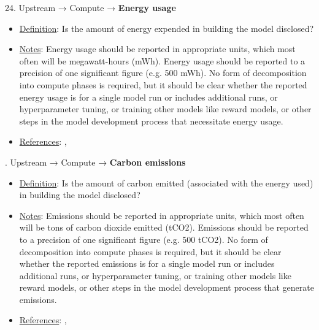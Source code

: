 24. Upstream → Compute → \textbf{Energy usage}
\vspace{-\parskip}
\begin{itemize}
	\item
	\underline{Definition}: Is the amount of energy expended in building the model disclosed?
	\item
	\underline{Notes}: Energy usage should be reported in appropriate units, which most often will be megawatt-hours (mWh). Energy usage should be reported to a precision of one significant figure (e.g. 500 mWh). No form of decomposition into compute phases is required, but it should be clear whether the reported energy usage is for a single model run or includes additional runs, or hyperparameter tuning, or training other models like reward models, or other steps in the model development process that necessitate energy usage.
	\item
	\underline{References}: \citet{lacoste2019quantifying}, \citet{patterson2021carbon}
\end{itemize} \vspace{\baselineskip}


. Upstream → Compute → \textbf{Carbon emissions}
\vspace{-\parskip}
\begin{itemize}
	\item
	\underline{Definition}: Is the amount of carbon emitted (associated with the energy used) in building the model disclosed?
	\item
	\underline{Notes}: Emissions should be reported in appropriate units, which most often will be tons of carbon dioxide emitted (tCO2). Emissions should be reported to a precision of one significant figure (e.g. 500 tCO2). No form of decomposition into compute phases is required, but it should be clear whether the reported emissions is for a single model run or includes additional runs, or hyperparameter tuning, or training other models like reward models, or other steps in the model development process that generate emissions.
	\item
	\underline{References}: \citet{lacoste2019quantifying}, \citet{patterson2021carbon}
\end{itemize} \vspace{\baselineskip}


